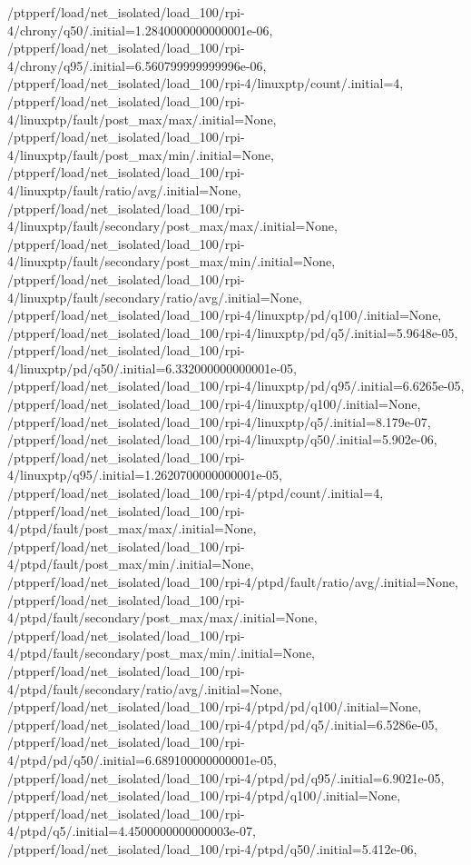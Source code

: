 {    /ptpperf/load/net_isolated/load_100/rpi-4/chrony/q50/.initial=1.2840000000000001e-06,
    /ptpperf/load/net_isolated/load_100/rpi-4/chrony/q95/.initial=6.560799999999996e-06,
    /ptpperf/load/net_isolated/load_100/rpi-4/linuxptp/count/.initial=4,
    /ptpperf/load/net_isolated/load_100/rpi-4/linuxptp/fault/post_max/max/.initial=None,
    /ptpperf/load/net_isolated/load_100/rpi-4/linuxptp/fault/post_max/min/.initial=None,
    /ptpperf/load/net_isolated/load_100/rpi-4/linuxptp/fault/ratio/avg/.initial=None,
    /ptpperf/load/net_isolated/load_100/rpi-4/linuxptp/fault/secondary/post_max/max/.initial=None,
    /ptpperf/load/net_isolated/load_100/rpi-4/linuxptp/fault/secondary/post_max/min/.initial=None,
    /ptpperf/load/net_isolated/load_100/rpi-4/linuxptp/fault/secondary/ratio/avg/.initial=None,
    /ptpperf/load/net_isolated/load_100/rpi-4/linuxptp/pd/q100/.initial=None,
    /ptpperf/load/net_isolated/load_100/rpi-4/linuxptp/pd/q5/.initial=5.9648e-05,
    /ptpperf/load/net_isolated/load_100/rpi-4/linuxptp/pd/q50/.initial=6.332000000000001e-05,
    /ptpperf/load/net_isolated/load_100/rpi-4/linuxptp/pd/q95/.initial=6.6265e-05,
    /ptpperf/load/net_isolated/load_100/rpi-4/linuxptp/q100/.initial=None,
    /ptpperf/load/net_isolated/load_100/rpi-4/linuxptp/q5/.initial=8.179e-07,
    /ptpperf/load/net_isolated/load_100/rpi-4/linuxptp/q50/.initial=5.902e-06,
    /ptpperf/load/net_isolated/load_100/rpi-4/linuxptp/q95/.initial=1.2620700000000001e-05,
    /ptpperf/load/net_isolated/load_100/rpi-4/ptpd/count/.initial=4,
    /ptpperf/load/net_isolated/load_100/rpi-4/ptpd/fault/post_max/max/.initial=None,
    /ptpperf/load/net_isolated/load_100/rpi-4/ptpd/fault/post_max/min/.initial=None,
    /ptpperf/load/net_isolated/load_100/rpi-4/ptpd/fault/ratio/avg/.initial=None,
    /ptpperf/load/net_isolated/load_100/rpi-4/ptpd/fault/secondary/post_max/max/.initial=None,
    /ptpperf/load/net_isolated/load_100/rpi-4/ptpd/fault/secondary/post_max/min/.initial=None,
    /ptpperf/load/net_isolated/load_100/rpi-4/ptpd/fault/secondary/ratio/avg/.initial=None,
    /ptpperf/load/net_isolated/load_100/rpi-4/ptpd/pd/q100/.initial=None,
    /ptpperf/load/net_isolated/load_100/rpi-4/ptpd/pd/q5/.initial=6.5286e-05,
    /ptpperf/load/net_isolated/load_100/rpi-4/ptpd/pd/q50/.initial=6.689100000000001e-05,
    /ptpperf/load/net_isolated/load_100/rpi-4/ptpd/pd/q95/.initial=6.9021e-05,
    /ptpperf/load/net_isolated/load_100/rpi-4/ptpd/q100/.initial=None,
    /ptpperf/load/net_isolated/load_100/rpi-4/ptpd/q5/.initial=4.4500000000000003e-07,
    /ptpperf/load/net_isolated/load_100/rpi-4/ptpd/q50/.initial=5.412e-06,
}
